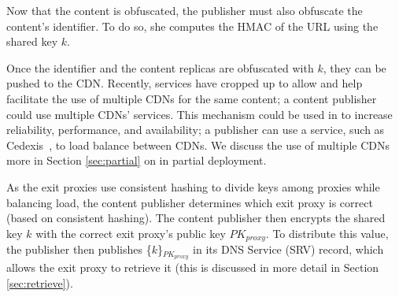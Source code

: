 Now that the content is obfuscated, the publisher must also obfuscate the content's identifier.  To do so, 
she computes the HMAC of the URL using the shared key $k$.

Once the identifier and the content replicas are obfuscated with $k$, they can be pushed to the 
CDN.  Recently, services have cropped up to allow and help facilitate the use of multiple CDNs for the same content; a content 
publisher could use multiple CDNs' services.  This mechanism could be used in \system{} to increase reliability, 
performance, and availability; a publisher can use a service, such as Cedexis~\cite{cedexis}, to load balance between 
CDNs.  We discuss the use of multiple CDNs more in Section \ref{sec:partial} on \system{} in 
partial deployment.  %

As the exit proxies use consistent hashing to divide keys among proxies while balancing load, the content publisher
determines which exit proxy is correct (based on consistent hashing).  The content publisher then encrypts the 
shared key $k$ with the correct exit proxy's public key $PK_{proxy}$.   To distribute this value, the publisher 
then publishes \{$k$\}$_{PK_{proxy}}$ in its DNS Service (SRV) record, which allows the exit proxy to retrieve it (this is discussed in more 
detail in Section \ref{sec:retrieve}).


